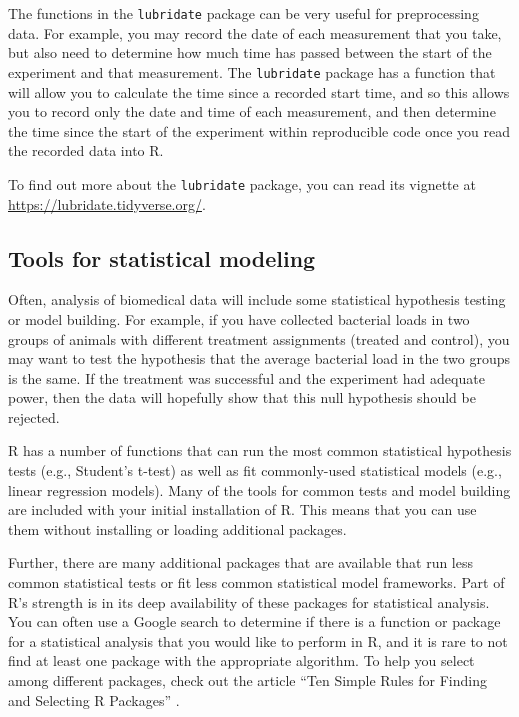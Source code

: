 \documentclass[]{tufte-book}
\begin{document}
The functions in the \texttt{lubridate} package can be very useful for preprocessing
data. For example, you may record the date of each measurement that you take,
but also need to determine how much time has passed between the start of the
experiment and that measurement. The \texttt{lubridate} package has a function that
will allow you to calculate the time since a recorded start time, and so this
allows you to record only the date and time of each measurement, and then
determine the time since the start of the experiment within reproducible code
once you read the recorded data into R.

To find out more about the \texttt{lubridate} package, you can read its vignette
at \url{https://lubridate.tidyverse.org/}.

\subsection{Tools for statistical modeling}\label{tools-for-statistical-modeling}

Often, analysis of biomedical data will include some statistical hypothesis
testing or model building. For example, if you have collected bacterial
loads in two groups of animals with different treatment assignments
(treated and control), you may want to test the hypothesis that the average
bacterial load in the two groups is the same. If the treatment was successful
and the experiment had adequate power, then the data will hopefully show that
this null hypothesis should be rejected.

R has a number of functions that can run the most common statistical
hypothesis tests (e.g., Student's t-test) as well as fit commonly-used
statistical models (e.g., linear regression models). Many of the tools
for common tests and model building are included with your initial installation
of R. This means that you can use them without installing or loading additional
packages.

Further, there are many additional packages that are available that run
less common statistical tests or fit less common statistical model frameworks.
Part of R's strength is in its deep availability of these packages for
statistical analysis. You can often use a Google search to determine if
there is a function or package for a statistical analysis that you would
like to perform in R, and it is rare to not find at least one package with
the appropriate algorithm. To help you select among different packages, check
out the article ``Ten Simple Rules for Finding and Selecting R Packages''
\citep{wendt2022ten}.
\end{document}
